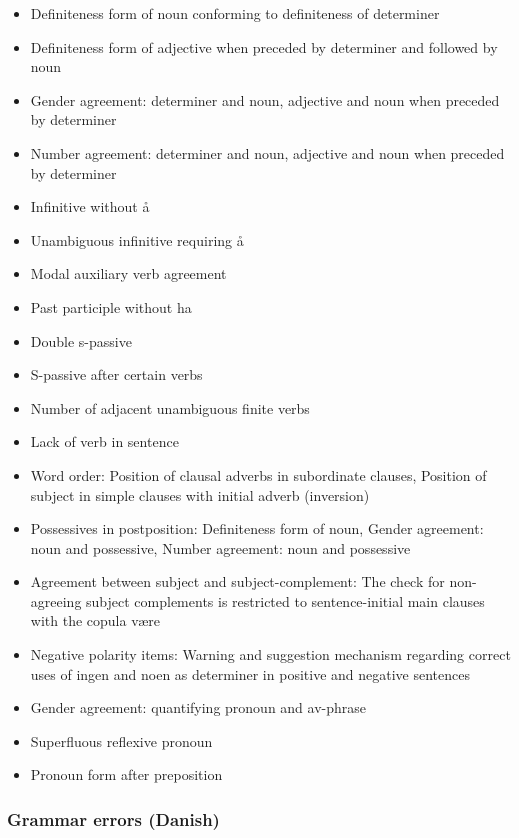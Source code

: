 \documentclass[a4paper,english,12pt]{article}
\begin{document}
\begin{spacing}{1.0}
\begin{itemize}
    \item     Definiteness form of noun conforming to definiteness of determiner
    \item Definiteness form of adjective when preceded by determiner and followed by noun
    \item Gender agreement: determiner and noun, adjective and noun when preceded by determiner
    \item Number agreement: determiner and noun, adjective and noun when preceded by determiner
    \item Infinitive without å
    \item Unambiguous infinitive requiring å
    \item Modal auxiliary verb agreement
    \item Past participle without ha
    \item Double s-passive
    \item S-passive after certain verbs
    \item Number of adjacent unambiguous finite verbs
    \item Lack of verb in sentence
	\item Word order: Position of clausal adverbs in subordinate clauses, Position of subject in simple clauses with initial adverb (inversion)
	\item Possessives in postposition: Definiteness form of noun, Gender agreement: noun and possessive, Number agreement: noun and possessive
    \item Agreement between subject and subject-complement: The check for non-agreeing subject complements is restricted to sentence-initial main clauses with the copula være
    \item Negative polarity items: Warning and suggestion mechanism regarding correct uses of ingen and noen as determiner in positive and negative sentences
    \item Gender agreement: quantifying pronoun and av-phrase
    \item Superfluous reflexive pronoun
    \item Pronoun form after preposition
\end{itemize}

\subsubsection{Grammar errors (Danish)}


\end{spacing}
\end{document}
